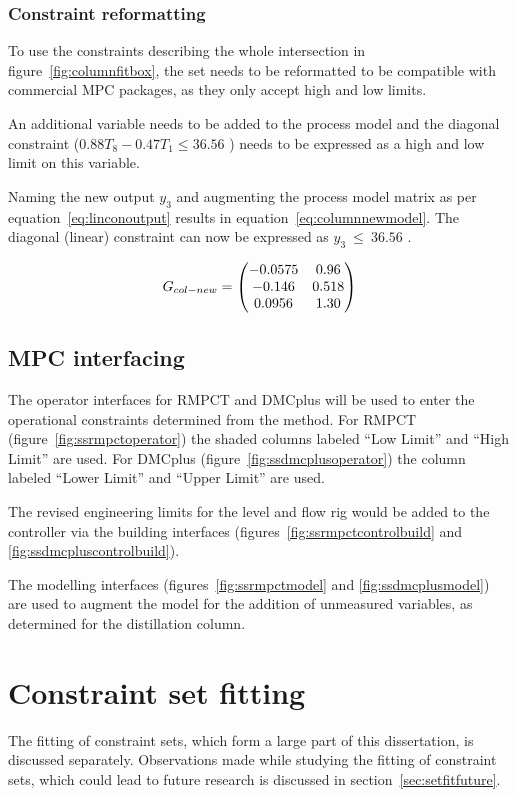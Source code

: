 \subsubsection{Constraint reformatting}
To use the constraints describing the whole intersection in figure~\ref{fig:columnfitbox}, the set needs to be reformatted to be compatible with commercial MPC packages, as they only accept high and low limits.

An additional variable needs to be added to the process model and the diagonal constraint ({$0.88T_8-0.47T_1\leq 36.56$ \textcelsius}) needs to be expressed as a high and low limit on this variable.

Naming the new output $y_3$ and augmenting the process model matrix as per equation~\ref{eq:linconoutput} results in equation~\ref{eq:columnnewmodel}.
The diagonal (linear) constraint can now be expressed as {$y_3~\leq~36.56$ \textcelsius}.

\begin{equation}
  \label{eq:columnnewmodel}
  G_{col-new}= \bpm -0.0575 & 0.96 \\       %
                  -0.146  & 0.518 \\      %
                   0.0956 & 1.30 \\ \epm  %
\end{equation}

\subsection{MPC interfacing}
The operator interfaces for RMPCT and DMCplus will be used to enter the operational constraints determined from the method.
For RMPCT (figure~\ref{fig:ssrmpctoperator}) the shaded columns labeled ``Low Limit'' and ``High Limit'' are used.
For DMCplus (figure~\ref{fig:ssdmcplusoperator}) the column labeled ``Lower Limit'' and ``Upper Limit'' are used.

The revised engineering limits for the level and flow rig would be added to the controller via the building interfaces (figures~\ref{fig:ssrmpctcontrolbuild} and \ref{fig:ssdmcpluscontrolbuild}).

The modelling interfaces (figures~\ref{fig:ssrmpctmodel} and \ref{fig:ssdmcplusmodel}) are used to augment the model for the addition of unmeasured variables, as determined for the distillation column.

\section{Constraint set fitting}
The fitting of constraint sets, which form a large part of this dissertation, is discussed separately.
Observations made while studying the fitting of constraint sets, which could lead to future research is discussed in section~\ref{sec:setfitfuture}.

